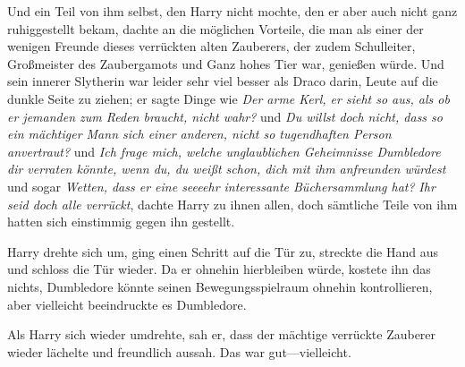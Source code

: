 Und ein Teil von ihm selbst, den Harry nicht mochte, den er aber auch nicht ganz ruhiggestellt bekam, dachte an die möglichen Vorteile, die man als einer der wenigen Freunde dieses verrückten alten Zauberers, der zudem Schulleiter, Großmeister des Zaubergamots und Ganz hohes Tier war, genießen würde. Und sein innerer Slytherin war leider sehr viel besser als Draco darin, Leute auf die dunkle Seite zu ziehen; er sagte Dinge wie \emph{Der arme Kerl, er sieht so aus, als ob er jemanden zum Reden braucht, nicht wahr?} und \emph{Du willst doch nicht, dass so ein mächtiger Mann sich einer anderen, nicht so tugendhaften Person anvertraut?} und \emph{Ich frage mich, welche unglaublichen Geheimnisse Dumbledore dir verraten könnte, wenn du, du weißt schon, dich mit ihm anfreunden würdest} und sogar \emph{Wetten, dass er eine seeeehr interessante Büchersammlung hat?}
\emph{Ihr seid doch alle verrückt}, dachte Harry zu ihnen allen, doch sämtliche Teile von ihm hatten sich einstimmig gegen ihn gestellt.

Harry drehte sich um, ging einen Schritt auf die Tür zu, streckte die Hand aus und schloss die Tür wieder. Da er ohnehin hierbleiben würde, kostete ihn das nichts, Dumbledore könnte seinen Bewegungsspielraum ohnehin kontrollieren, aber vielleicht beeindruckte es Dumbledore.

Als Harry sich wieder umdrehte, sah er, dass der mächtige verrückte Zauberer wieder lächelte und freundlich aussah. Das war gut—vielleicht.

